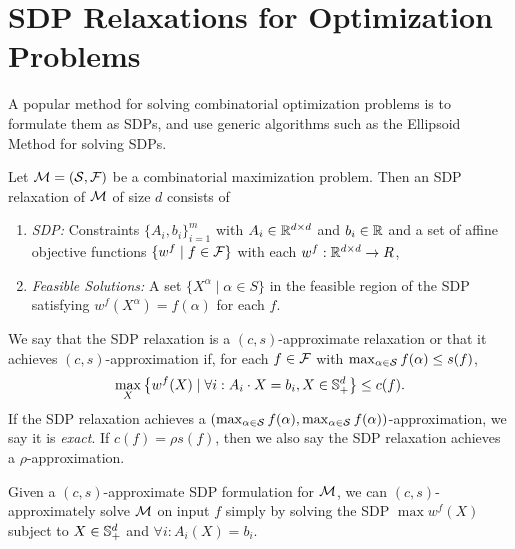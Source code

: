 \section{SDP Relaxations for Optimization Problems}\label{prelims_sdp_relaxations}
A popular method for solving combinatorial optimization problems is to formulate them as SDPs, and use generic algorithms such as the Ellipsoid Method for solving SDPs.
\begin{definition}
Let $\mathcal M = (\mathcal S, \mathcal F)$ be a combinatorial maximization problem. Then an
  SDP relaxation of \(\mathcal M\)
  of size \(d\)
  consists of
	\begin{enumerate}
	\item \emph{SDP:} Constraints $\{A_i, b_i\}_{i=1}^m$ with $A_i \in \mathbb R^{d \times d}$ and $b_i \in \mathbb R$ and a set of affine objective functions $\{w^f \mid f \in \mathcal F\}$ with each $w^f: \mathbb R^{d \times d} \rightarrow R$,
	\item \emph{Feasible Solutions:} A set $\{X^\alpha \mid \alpha \in S\}$ in the feasible region of the SDP satisfying $w^f(X^\alpha) = f(\alpha)$ for each $f$.
	\end{enumerate}
	We say that the SDP relaxation is a $(c,s)$-approximate relaxation or that it achieves $(c,s)$-approximation if, for each
	$f \in \mathcal F$ with $\max_{\alpha \in \mathcal S} f(\alpha) \leq s(f)$,
	\[\max_X \left\{ w^f(X) \mid \forall i: A_i \cdot X = b_i, X \in \mathbb{S}^{d}_+\right\} \leq c(f).\]
	If the SDP relaxation achieves a $(\max_{\alpha\in \mathcal S} f(\alpha), \max_{\alpha\in \mathcal S} f(\alpha))$-approximation, we say it is \emph{exact}. If $c(f) = \rho s(f)$, then we also say the SDP relaxation achieves a $\rho$-approximation.
\end{definition}
Given a $(c,s)$-approximate SDP formulation for $\mathcal M$, we can $(c,s)$-approximately solve $\mathcal M$ on input $f$ simply by solving
the SDP $\max w^f(X)$ subject to $X \in \mathbb{S}^{d}_+$ and $\forall i: A_i(X) = b_i$.

